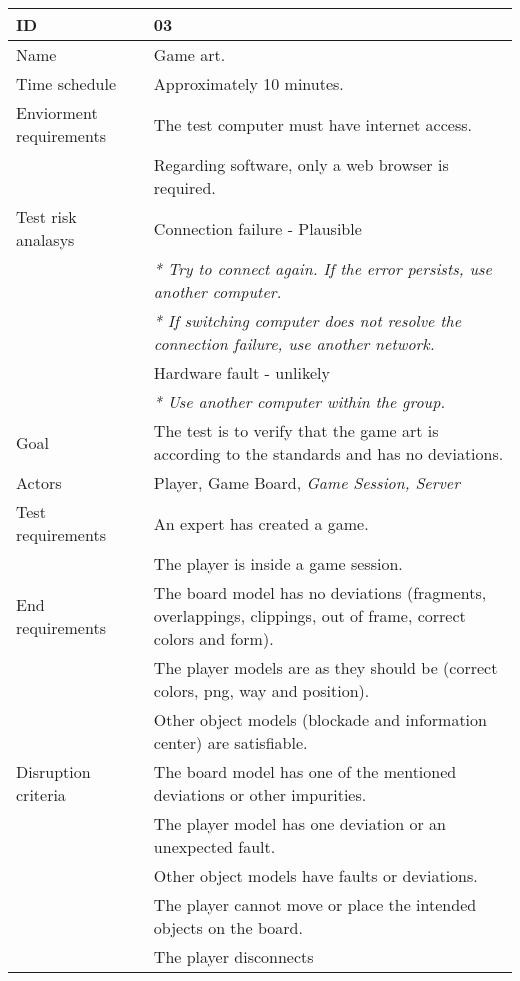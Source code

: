 
{\footnotesize
\begin{table}[H]
\begin{tabular}{| p{5cm} | p{10cm} |}\hline
	\textbf{ID}	& \textbf{03}\\ \hline
	Name		& Game art.\\ \hline
	Time schedule	& Approximately 10 minutes.\\ \hline
	Enviorment requirements 
		& The test computer must have internet access. \\
		& Regarding software, only a web browser is required. \\ \hline
	Test risk analasys 
		& Connection failure - Plausible \\
		& \emph{* Try to connect again. If the error persists, use another computer.}\\
		& \emph{* If switching computer does not resolve the connection failure, use another network.}\\ 
		& Hardware fault - unlikely \\
		& \emph{* Use another computer within the group.} \\ \hline
	Goal	& The test is to verify that the game art is according to the standards and has no deviations. \\ \hline
	Actors	& Player, Game Board, \emph{Game Session, Server}\\ \hline
	Test requirements
		& An expert has created a game.\\
		& The player is inside a game session.\\ \hline
	End requirements 
		& The board model has no deviations (fragments, overlappings, clippings, out of frame, correct colors and form). \\
		& The player models are as they should be (correct colors, png, way and position). \\
		& Other object models (blockade and information center) are satisfiable. \\ \hline
	Disruption criteria 
		& The board model has one of the mentioned deviations or other impurities.\\
		& The player model has one deviation or an unexpected fault.\\
		& Other object models have faults or deviations.\\
		& The player cannot move or place the intended objects on the board.\\
		& The player disconnects \\ \hline

\end{tabular}
\end{table}}
